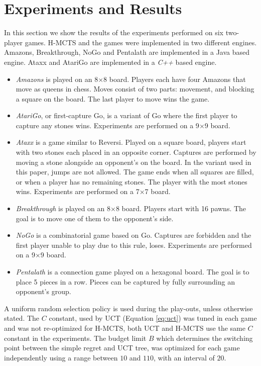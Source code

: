 \documentclass[a4paper]{llncs}
\begin{document}
\section{Experiments and Results}
\label{sec:exp_res}
In this section we show the results of the experiments performed on six two-player games. H-MCTS and the games were implemented in two different engines. Amazons, Breakthrough, NoGo and Pentalath are implemented in a Java based engine. Ataxx and AtariGo are implemented in a \emph{C++} based engine.
\begin{itemize}
\item \emph{Amazons} is played on an 8$\times$8 board. Players each have four Amazons that move as queens in chess. Moves consist of two parts: movement, and blocking a square on the board. The last player to move wins the game.
\item \emph{AtariGo}, or first-capture Go, is a variant of Go where the first player to capture any stones wins. Experiments are performed on a 9$\times$9 board.
\item \emph{Ataxx} is a game similar to Reversi. Played on a square board, players start with two stones each placed in an opposite corner. Captures are performed by moving a stone alongside an opponent's on the board. In the variant used in this paper, jumps are not allowed. The game ends when all squares are filled, or when a player has no remaining stones. The player with the most stones wins. Experiments are performed on a 7$\times$7 board.
\item \emph{Breakthrough} is played on an 8$\times$8 board. Players start with 16 pawns. The goal is to move one of them to the opponent's side.
\item \emph{NoGo} is a combinatorial game based on Go. Captures are forbidden and the first player unable to play due to this rule, loses. Experiments are performed on a 9$\times$9 board.
\item \emph{Pentalath} is a connection game played on a hexagonal board. The goal is to place 5 pieces in a row. Pieces can be captured by fully surrounding an opponent's group.
\end{itemize}

A uniform random selection policy is used during the play-outs, unless otherwise stated. The $C$ constant, used by UCT (Equation \ref{eq:uct}) was tuned in each game and was not re-optimized for H-MCTS, both UCT and H-MCTS use the same $C$ constant in the experiments. The budget limit $B$ which determines the switching point between the simple regret and UCT tree, was optimized for each game independently using a range between $10$ and $110$, with an interval of $20$.
\end{document}
